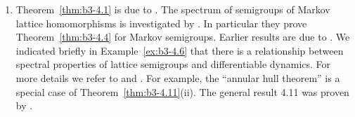 \begin{enumerate}[label=\emph{Section \arabic*:}, wide]
\item
Theorem~\ref{thm:b3-4.1} is due to \citet{derndinger:1984}.
The spectrum of semigroups of Markov lattice homomorphisms is investigated by \citet{derndingernagel:1979}.
In particular they prove Theorem~\ref{thm:b3-4.4} for Markov semigroups.
Earlier results are due to \citet{scarpellini:1974}.
We indicated briefly in Example~\ref{ex:b3-4.6} that there is a relationship between spectral properties of lattice semigroups and differentiable dynamics.
For more details we refer to \citet{chiconeswanson:1981} and \citet{sackersell:1978}.
For example, the \enquote{annular hull theorem} is a special case of Theorem~\ref{thm:b3-4.11}(ii).
The general result 4.11 was proven by \citet{arendtgreiner:1984}.

\end{enumerate}


\begin{comment}
\section*{References}
\addcontentsline{toc}{section}{References}
{\RaggedRight
\renewcommand{\bibsection}{}

}
\end{comment} 
 